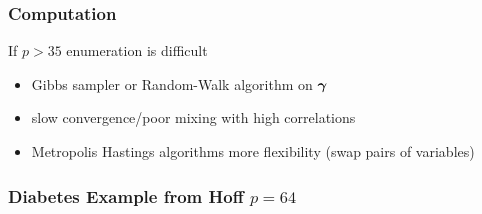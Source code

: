 \documentclass[]{beamer}
\begin{document}
\begin{frame}\frametitle{Computation}

If $p > 35$  enumeration is difficult

  \begin{itemize}
  \item Gibbs sampler or Random-Walk algorithm on $\boldsymbol{\gamma}$ \pause
  \item slow convergence/poor mixing with high correlations \pause
  \item Metropolis Hastings algorithms more flexibility \pause
        (swap pairs of variables)

\end{itemize}

\end{frame}


\begin{frame}[fragile] \frametitle{Diabetes Example from Hoff $p=64$ }


\end{frame}
\end{document}
